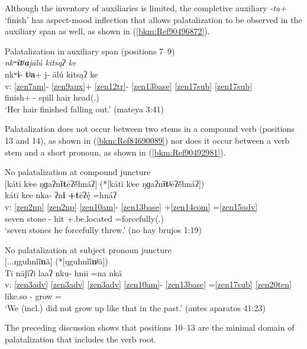 \documentclass[output=paper]{langscibook}
\begin{document}
Although the inventory of auxiliaries is limited, the completive auxiliary \textit{{}-ta+} `finish' has aspect-mood inflection that allows palatalization to be observed in the auxiliary span as well, as shown in (\ref{bkm:Ref90496872}).


\ea\label{bkm:Ref90496872}Palatalization in auxiliary span (positions 7{}--9)\\
\textit{nkʷ\textbf{itʲa}jālú kitsąʔ ke} \\ 
\glll {} nkʷ\textbf{i}{}- \textbf{tʲa}+ j- ālú kitsąʔ ke\\
v: \ref{zen7am}- \ref{zen9aux}+ \ref{zen12tr}{}- \ref{zen13base} \ref{zen17sub} \ref{zen17sub} \\ 
{} \Pfv{} finish+ \Itr{}- spill hair head(.\Third{})\\
\glt `Her hair finished falling out.' (mateya 3:41)
\z

Palatalization does not occur between two stems in a compound verb (positions 13 and 14), as shown in (\ref{bkm:Ref84690089}) nor does it occur between a verb stem and a short pronoun, as shown in (\ref{bkm:Ref90492981}).


\ea\label{bkm:Ref84690089}No palatalization at compound juncture \\
$[$kátī kʲee ŋɡaʔn\textbf{ĩt}ēʔẽ́hnáʔ$]$ (*[kátī kʲee ŋɡaʔn\textbf{ĩtʲ}ēʔẽ́hnáʔ])  \\
\glll {} kátī kee nka- ʔn\textbf{i} \textbf{+t}ēʔę́ =hnáʔ  \\
v: \ref{zen2np} \ref{zen2np} \ref{zen10am}{}- \ref{zen13base} +\ref{zen14com} =\ref{zen15adv} \\ 
{} seven stone \Pfv{}- hit +\Tr{}.be.located =forcefully(.\Third{})\\
\glt `seven stones he forcefully threw.' (no hay brujos 1:19)
\z



\ea\label{bkm:Ref90492981}No palatalization at subject pronoun juncture\\
$[$...ŋguhnĩĩ\textbf{n}ã$]$ (*[ŋguhnĩĩ\textbf{nʲ}ã])\\
\glll {} Tī nāʃíʔi laaʔ nku- hnii =na nkā    \\
v: \ref{zen3adv} \ref{zen3adv} \ref{zen3adv} \ref{zen10am}{}- \ref{zen13base} =\ref{zen17sub} \ref{zen20ten} \\ 
{} \Tplz{} \Neg{} like.so \Pfv{}- grow =\First\Incl{} \Pst{}\\
\glt `We (incl.) did not grow up like that in the past.' (antes aparatos 41:23)
\z

The preceding discussion shows that positions 10{}--13 are the minimal domain of palatalization that includes the verb root.
\end{document}
